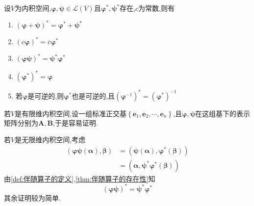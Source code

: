 \begin{formal}
    \begin{proposition}[伴随算子的运算]\label{prop:伴随算子的运算}
        设$V$为内积空间,$\bm{\varphi},\bm{\psi}\in\mathcal{L}\left(V\right)$且$\bm{\varphi}^*,\bm{\psi}^*$存在,$c$为常数,则有\begin{enumerate}[label={\textup{(\arabic*)}}]
            \item $\left(\bm{\varphi}+\bm{\psi}\right)^*=\bm{\varphi}^*+\bm{\psi}^*$
            \item $\left(c\bm{\varphi}\right)^*=\overline{c}\bm{\varphi}^*$
            \item $\left(\bm{\varphi\psi}\right)^*=\bm{\psi}^*\bm{\varphi}^*$
            \item $\left(\bm{\varphi}^*\right)^*=\bm{\varphi}$
            \item 若$\bm{\varphi}$是可逆的,则$\bm{\varphi}^*$也是可逆的,且$\left(\bm{\varphi}^{-1}\right)^*=\left(\bm{\varphi}^*\right)^{-1}$
        \end{enumerate}
    \end{proposition}
    \begin{Proof}
        若$V$是有限维内积空间,设一组标准正交基$\left\{
            \bm{e}_1,\bm{e}_2,\cdots,\bm{e}_n
            \right\}$,且$\bm{\varphi},\bm{\psi}$在这组基下的表示矩阵分别为$\bm{A},\bm{B}$,于是容易证明.

            若$V$是无限维内积空间,考虑\begin{align*}
                \left(
                    \bm{\varphi}\bm{\psi}\left(\bm{\alpha}\right),\bm{\beta}
                \right)&=\left(
                    \bm{\psi}\left(\bm{\alpha}\right),\bm{\varphi}^*\left(\bm{\beta}\right)
                \right)\\
                &=\left(
                    \bm{\alpha},\bm{\psi}^*\bm{\varphi}^*\left(\bm{\beta}\right)
                \right)
            \end{align*}由\cref{def:伴随算子的定义},\cref{thm:伴随算子的存在性}知\[
            \left(
                \bm{\varphi}\bm{\psi}
            \right)^*=\bm{\psi}^*\bm{\varphi}^*
            \]其余证明较为简单.\qedhere
    \end{Proof}
\end{formal}
